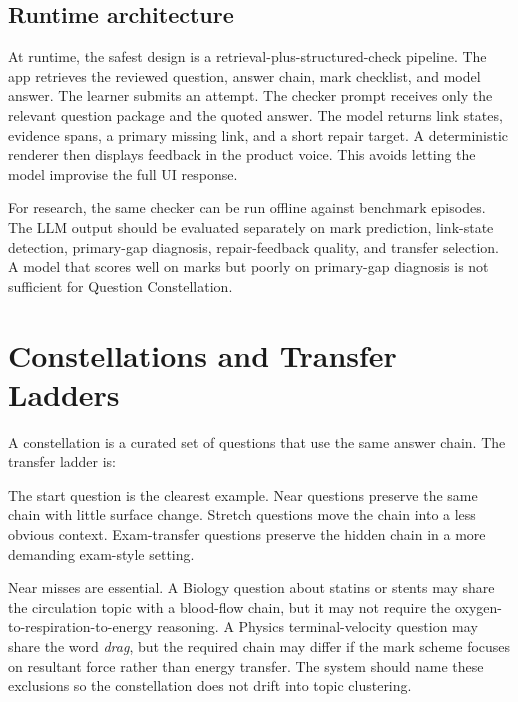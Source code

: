 \documentclass[11pt]{article}
\begin{document}
\subsection{Runtime architecture}

At runtime, the safest design is a retrieval-plus-structured-check pipeline. The app retrieves the reviewed question, answer chain, mark checklist, and model answer. The learner submits an attempt. The checker prompt receives only the relevant question package and the quoted answer. The model returns link states, evidence spans, a primary missing link, and a short repair target. A deterministic renderer then displays feedback in the product voice. This avoids letting the model improvise the full UI response.

For research, the same checker can be run offline against benchmark episodes. The LLM output should be evaluated separately on mark prediction, link-state detection, primary-gap diagnosis, repair-feedback quality, and transfer selection. A model that scores well on marks but poorly on primary-gap diagnosis is not sufficient for Question Constellation.

\section{Constellations and Transfer Ladders}

A constellation is a curated set of questions that use the same answer chain. The transfer ladder is:

\begin{center}
\end{center}

The start question is the clearest example. Near questions preserve the same chain with little surface change. Stretch questions move the chain into a less obvious context. Exam-transfer questions preserve the hidden chain in a more demanding exam-style setting.

Near misses are essential. A Biology question about statins or stents may share the circulation topic with a blood-flow chain, but it may not require the oxygen-to-respiration-to-energy reasoning. A Physics terminal-velocity question may share the word \textit{drag}, but the required chain may differ if the mark scheme focuses on resultant force rather than energy transfer. The system should name these exclusions so the constellation does not drift into topic clustering.
\end{document}
